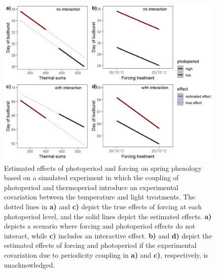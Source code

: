 \documentclass[11pt]{article}
\begin{document}
 \begin{figure}[h!]
    \centering
 \includegraphics[width=.8\textwidth]{..//Plots/periodicity_figures/apparent.jpeg}
    \caption{Estimated effects of photoperiod and forcing on spring phenology based on a simulated experiment in which the coupling of photoperiod and thermoperiod introduce an experimental covariation between the temperature and light treatments. The dotted lines in \textbf{a)} and \textbf{c)} depict the true effects of forcing at each photoperiod level, and the solid lines depict the estimated effects. \textbf{a)} depicts a scenario where forcing and photoperiod effects do not interact, while \textbf{c)} includes an interactive effect. \textbf{b)} and \textbf{d)} depict the estimated effects of forcing and photoperiod if the experimental covariation due to periodicity coupling in \textbf{a)} and \textbf{c)}, respectively, is unacknowledged.}
    \label{fig:3d}
\end{figure}
 
\end{document}
